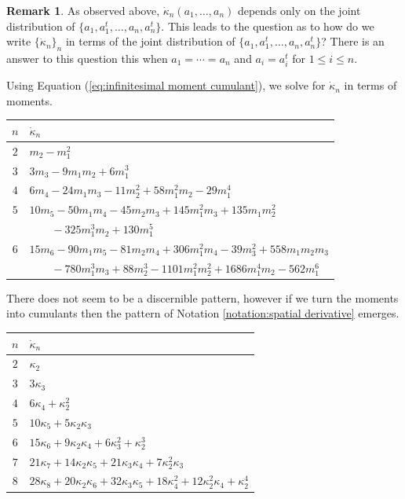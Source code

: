 \documentclass[11pt]{amsart}
\theoremstyle{definition}
\newtheorem{remark}[theorem]{Remark}
\numberwithin{theorem}{section}
\begin{document}
\begin{remark}
As observed above, $\dot\kappa_n(a_1, \dots, a_n)$ depends
only on the joint distribution of $\{a_1, a_1^t, \dots, a_n,
a_n^t\}$. This leads to the question as to how do we write
$\{\dot\kappa_n\}_n$ in terms of the joint distribution of
$\{a_1, a_1^t, \dots, a_n, a_n^t\}$? There is an answer to
this question this when $a_1 = \cdots =a_n$ and $a_i =
a_i^t$ for $1 \leq i \leq n$.


Using Equation (\ref{eq:infinitesimal moment cumulant}), we
solve for $\dot\kappa_n$ in terms of moments.  \begingroup
\renewcommand{\arraystretch}{1.5}
\begin{center}
\begin{tabular}{c|l}
$n$ & $\dot\kappa_n$ \\ \hline
$2$ & $m_2 - m_1^2$ \\
$3$ & $3 m_3 - 9 m_1 m_2 + 6m_1^3$\\
$4$ & $6m_4 - 24 m_1 m_3 - 11m_2^2 + 58 m_1^2 m_2 - 29 m_1^4$ \\
$5$ & $10 m_5 - 50 m_1 m_4 - 45 m_2 m_3 + 145 m_1^2 m_3 + 1 35 m_1 m_2^2$ \\
    & $\qquad\mbox{} - 325 m_1^3 m_2 + 130 m_1^5$ \\
$6$ & $15 m_6 - 90 m_1 m_5 - 81 m_2 m_4 + 306 m_1^2 m_4 - 39 m_3^2 + 558 m_1 m_2 m_3$ \\
    & $\qquad\mbox{} - 780 m_1^3 m_3 + 88 m_2^3 - 1101 m_1^2 m_2^2 + 1686 m_1^4 m_2 - 562 m_1^6$ \\    
\end{tabular}
\end{center}
There does not seem to be a discernible pattern, however if
we turn the moments into cumulants then the pattern of
Notation \ref{notation:spatial derivative} emerges.
\begin{center}
\begin{tabular}{c|l}
$n$ &  $\dot\kappa_n$ \\ \hline
$2$ & $\kappa_2$ \\
$3$ & $3 \kappa_3$ \\
$4$ & $6\kappa_4 + \kappa_2^2$  \\
$5$ & $10 \kappa_5 + 5 \kappa_2 \kappa_3$ \\
$6$ & $15 \kappa_6 + 9 \kappa_2 \kappa_4 + 6 \kappa_3^2 + \kappa_2^3$\\
$7$ & $21 \kappa_7 + 14 \kappa_2 \kappa_5 + 21 \kappa_3 \kappa_4 
+ 7 \kappa_2^2 \kappa_3$\\
$8$ & $28 \kappa_8 + 20 \kappa_2 \kappa_6 + 32 \kappa_3 \kappa_5 + 18 \kappa^2_4 + 12 \kappa_2^2 \kappa_4 + \kappa_2^4$\\  

\end{tabular}
\end{center}
\end{remark}
\end{document}
